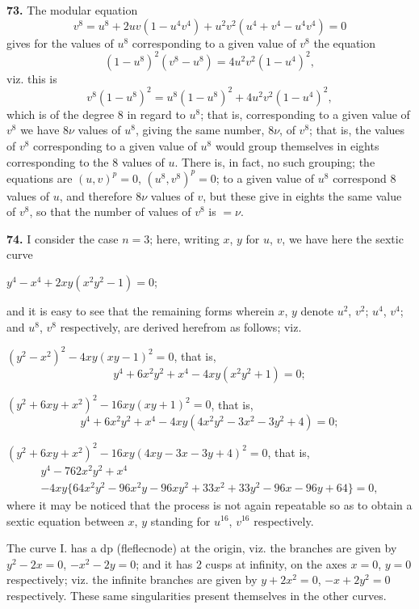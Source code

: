 \documentclass[12pt,a4paper]{article}
\begin{document}
\textbf{73.} The modular equation
\[
v^8 = u^8 + 2uv(1 - u^4 v^4) + u^2 v^2(u^4 + v^4 - u^4 v^4) = 0
\]
gives for the values of $u^8$ corresponding to a given value of $v^8$ the equation
\[
(1 - u^8)^2(v^8 - u^8) = 4u^2 v^2(1 - u^4)^2,
\]
viz. this is
\[
v^8(1 - u^8)^2 = u^8(1 - u^8)^2 + 4u^2 v^2(1 - u^4)^2,
\]
which is of the degree $8$ in regard to $u^8$; that is, corresponding to a given value of $v^8$ we have $8\nu$ values of $u^8$, giving the same number, $8\nu$, of $v^8$; that is, the values of $v^8$ corresponding to a given value of $u^8$ would group themselves in eights corresponding to the 8 values of $u$. There is, in fact, no such grouping; the equations are $(u, v)^p = 0$, $(u^8, v^8)^p = 0$; to a given value of $u^8$ correspond 8 values of $u$, and therefore $8\nu$ values of $v$, but these give in eights the same value of $v^8$, so that the number of values of $v^8$ is $= \nu$.

\textbf{74.} I consider the case $n = 3$; here, writing $x$, $y$ for $u$, $v$, we have here the sextic curve

 \quad $y^4 - x^4 + 2xy(x^2 y^2 - 1) = 0$;

and it is easy to see that the remaining forms wherein $x$, $y$ denote $u^2$, $v^2$; $u^4$, $v^4$; and $u^8$, $v^8$ respectively, are derived herefrom as follows; viz.

 \quad $(y^2 - x^2)^2 - 4xy(xy - 1)^2 = 0$, that is,
\[
y^4 + 6x^2 y^2 + x^4 - 4xy(x^2 y^2 + 1) = 0;
\]

 \quad $(y^2 + 6xy + x^2)^2 - 16xy(xy + 1)^2 = 0$, that is,
\[
y^4 + 6x^2 y^2 + x^4 - 4xy(4x^2 y^2 - 3x^2 - 3y^2 + 4) = 0;
\]

 \quad $(y^2 + 6xy + x^2)^2 - 16xy(4xy - 3x - 3y + 4)^2 = 0$, that is,
\begin{multline*}
y^4 - 762x^2 y^2 + x^4 \\
- 4xy\{64x^2 y^2 - 96x^2 y - 96xy^2 + 33x^2 + 33y^2 - 96x - 96y + 64\} = 0,
\end{multline*}
where it may be noticed that the process is not again repeatable so as to obtain a sextic equation between $x$, $y$ standing for $u^{16}$, $v^{16}$ respectively.

The curve I. has a dp (fleflecnode) at the origin, viz. the branches are given by $y^2 - 2x = 0$, $-x^2 - 2y = 0$; and it has 2 cusps at infinity, on the axes $x = 0$, $y = 0$ respectively; viz. the infinite branches are given by $y + 2x^2 = 0$, $-x + 2y^2 = 0$ respectively. These same singularities present themselves in the other curves.
\end{document}
